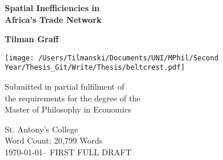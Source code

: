 \documentclass[11pt, oneside]{article}   	%
\begin{document}

\begin{titlepage}
    \begin{center}
        \vspace*{0cm}

        \Huge
        \textbf{Spatial Inefficiencies in \\
        Africa's Trade Network}

        \vspace{0.5cm}


        \vspace{1.5cm}
        \LARGE
        \textbf{Tilman Graff}

        \vfill

        \texttt{[image: /Users/Tilmanski/Documents/UNI/MPhil/Second Year/Thesis\_Git/Write/Thesis/beltcrest.pdf]}

        \vfill

        Submitted in partial fulfilment of \\
        the requirements for the degree of the \\
        Master of Philosophy in Economics

        \vspace{0.8cm}



        \large
        St. Antony's College\\
        Word Count: 20,799 Words\\
        \today -- FIRST FULL DRAFT

    \end{center}
\end{titlepage}

\newpage
\end{document}
